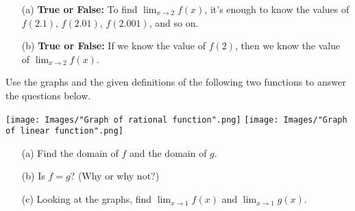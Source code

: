 \documentclass[handout,nooutcomes]{ximera}
\begin{document}
\begin{problem}
  \label{problem:conceptual-check-on-limit-definition}
  \mbox{}
  \begin{itemize}
    \item[(a)]
      \textbf{True or False:}
      To find $\lim_{x \to 2} f(x)$, it's enough to know the values of $f(2.1)$, $f(2.01)$, $f(2.001)$, and so on.

    \item[(b)]
      \textbf{True or False:}
       If we know the value of $f(2)$, then we know the value of $\lim_{x \to 2} f(x)$.
  \end{itemize}
\end{problem}

\begin{problem}
  \label{problem:finding-limits-via-graphs}
  Use the graphs and the given definitions of the following two functions to answer the questions below.
  \begin{image}
    \hspace*{-5em}
    \texttt{[image: Images/"Graph of rational function".png]}
    \hspace*{3em}
        \texttt{[image: Images/"Graph of linear function".png]}
  \end{image}
  \begin{itemize}
    \item[(a)]
      Find the domain of $f$ and the domain of $g$.

    \item[(b)]
      Is $f = g$?
      (Why or why not?)

    \item[(c)]
      Looking at the graphs, find $\lim_{x \to 1} f(x)$ and $\lim_{x \to 1} g(x)$.
  \end{itemize}
\end{problem}
\end{document}
